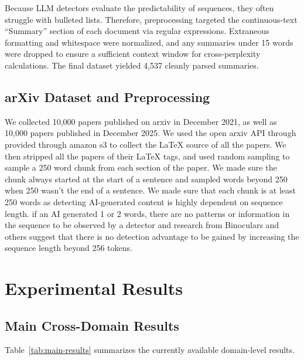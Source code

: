 \documentclass[11pt]{article}
\begin{document}
Because LLM detectors evaluate the predictability of sequences, they often struggle with bulleted lists. Therefore, preprocessing targeted the continuous-text ``Summary'' section of each document via regular expressions. Extraneous formatting and whitespace were normalized, and any summaries under 15 words were dropped to ensure a sufficient context window for cross-perplexity calculations. The final dataset yielded 4,537 cleanly parsed summaries.

\subsection{arXiv Dataset and Preprocessing}
We collected 10,000 papers published on arxiv in December 2021, as well as 10,000 papers published in December 2025. We used the open arxiv API through provided through amazon s3 to collect the LaTeX source of all the papers. We then stripped all the papers of their LaTeX tags, and used random sampling to sample a 250 word chunk from each section of the paper. We made sure the chunk always started at the start of a sentence and sampled words beyond 250 when 250 wasn't the end of a sentence. We made sure that each chunk is at least 250 words as detecting AI-generated content is highly dependent on sequence length. if an AI generated 1 or 2 words, there are no patterns or information in the sequence to be observed by a detector and research from Binoculars and others suggest that there is no detection advantage to be gained by increasing the sequence length beyond 256 tokens.

\section{Experimental Results}
\subsection{Main Cross-Domain Results}
Table~\ref{tab:main-results} summarizes the currently available domain-level
results. 
\end{document}
